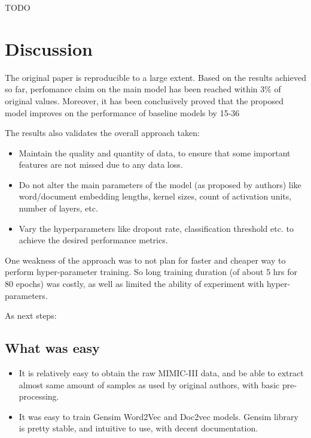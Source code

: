 \documentclass[11pt,a4paper]{article}
\begin{document}
TODO

\section{Discussion}

The original paper is reproducible to a large extent. Based on the results achieved so far, perfomance claim on the main model has been reached within 3\% of original values. Moreover, it has been conclusively proved that the proposed model improves on the performance of baseline models by 15-36%

The results also validates the overall approach taken:
\begin{itemize}
	\item Maintain the quality and quantity of data, to ensure that some important features are not missed due to any data loss.
	\item Do not alter the main parameters of the model (as proposed by authors) like word/document embedding lengths, kernel sizes, count of activation units, number of layers, etc.
	\item Vary the hyperparameters like dropout rate, classification threshold etc. to achieve the desired performance metrics. 
\end{itemize}

One weakness of the approach was to not plan for faster and cheaper way to perform hyper-parameter training. So long training duration (of about 5 hrs for 80 epochs) was costly, as well as limited the ability of experiment with hyper-parameters.

As next steps:



\subsection{What was easy}
\begin{itemize}
	\item It is relatively easy to obtain the raw MIMIC-III data, and be able to extract almost same amount of samples as used by original authors, with basic pre-processing. 
	\item It was easy to train Gensim Word2Vec and Doc2vec models. Gensim library is pretty stable, and intuitive to use, with decent documentation.
\end{itemize}
\end{document}
